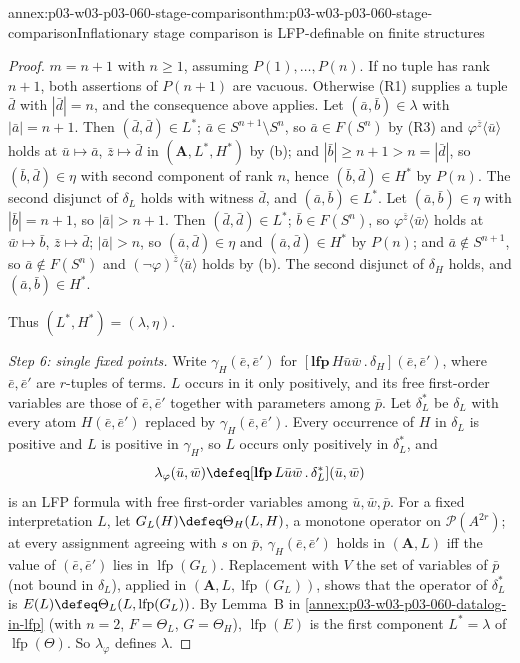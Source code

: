 \begin{annexitem}{annex:p03-w03-p03-060-stage-comparison}{thm:p03-w03-p03-060-stage-comparison}{Inflationary stage comparison is LFP-definable on finite structures}
\begin{proof}
\(m=n+1\) with \(n\ge1\), assuming \(P(1),\ldots,P(n)\).
If no tuple has rank \(n+1\), both assertions of \(P(n+1)\)
are vacuous. Otherwise (R1) supplies a tuple \(\bar d\) with
\(|\bar d|=n\), and the consequence above applies. Let
\((\bar a,\bar b)\in\lambda\) with \(|\bar a|=n+1\). Then
\((\bar d,\bar d)\in L^\ast\); \(\bar a\in S^{n+1}\setminus S^n\), so
\(\bar a\in F(S^n)\) by (R3) and \(\varphi^{\bar z}\langle\bar u\rangle\)
holds at \(\bar u\mapsto\bar a\), \(\bar z\mapsto\bar d\) in
\((\mathbf A,L^\ast,H^\ast)\) by (b); and \(|\bar b|\ge n+1>n=|\bar d|\),
so \((\bar b,\bar d)\in\eta\) with second component of rank \(n\), hence
\((\bar b,\bar d)\in H^\ast\) by \(P(n)\). The second disjunct of
\(\delta_L\) holds with witness \(\bar d\), and
\((\bar a,\bar b)\in L^\ast\). Let \((\bar a,\bar b)\in\eta\) with
\(|\bar b|=n+1\), so \(|\bar a|>n+1\). Then \((\bar d,\bar d)\in L^\ast\);
\(\bar b\in F(S^n)\), so \(\varphi^{\bar z}\langle\bar w\rangle\) holds at
\(\bar w\mapsto\bar b\), \(\bar z\mapsto\bar d\); \(|\bar a|>n\), so
\((\bar a,\bar d)\in\eta\) and \((\bar a,\bar d)\in H^\ast\) by \(P(n)\);
and \(\bar a\notin S^{n+1}\), so \(\bar a\notin F(S^n)\) and
\((\neg\varphi)^{\bar z}\langle\bar u\rangle\) holds by (b). The second
disjunct of \(\delta_H\) holds, and \((\bar a,\bar b)\in H^\ast\).

Thus \((L^\ast,H^\ast)=(\lambda,\eta)\).

\emph{Step 6: single fixed points.} Write
\(\gamma_H(\bar e,\bar e')\) for
\([\mathbf{lfp}\,H\bar u\bar w\,.\,\delta_H](\bar e,\bar e')\), where
\(\bar e,\bar e'\) are \(r\)-tuples of terms. \(L\) occurs in it only
positively, and its free first-order variables are those of
\(\bar e,\bar e'\) together with parameters among \(\bar p\). Let
\(\delta_L^\ast\) be \(\delta_L\) with every atom \(H(\bar e,\bar e')\)
replaced by \(\gamma_H(\bar e,\bar e')\). Every occurrence of \(H\) in
\(\delta_L\) is positive and \(L\) is positive in \(\gamma_H\), so \(L\)
occurs only positively in \(\delta_L^\ast\), and
\[
 \lambda_\varphi(\bar u,\bar w)\defeq[\mathbf{lfp}\,L\bar u\bar w\,.\,\delta_L^\ast](\bar u,\bar w)
\]
is an LFP formula with free first-order variables among
\(\bar u,\bar w,\bar p\). For a fixed interpretation \(L\), let
\(G_L(H)\defeq\Theta_H(L,H)\), a monotone operator on
\(\mathcal P(A^{2r})\); at every assignment agreeing with \(s\) on
\(\bar p\), \(\gamma_H(\bar e,\bar e')\) holds in \((\mathbf A,L)\) iff the
value of \((\bar e,\bar e')\) lies in \(\operatorname{lfp}(G_L)\).
Replacement with \(V\) the set of variables of \(\bar p\) (not bound in
\(\delta_L\)), applied in \((\mathbf A,L,\operatorname{lfp}(G_L))\), shows
that the operator of \(\delta_L^\ast\) is
\(E(L)\defeq\Theta_L(L,\operatorname{lfp}(G_L))\). By Lemma~B in
\cref{annex:p03-w03-p03-060-datalog-in-lfp} (with \(n=2\),
\(F=\Theta_L\), \(G=\Theta_H\)), \(\operatorname{lfp}(E)\) is the first
component \(L^\ast=\lambda\) of \(\operatorname{lfp}(\Theta)\). So
\(\lambda_\varphi\) defines \(\lambda\).


\end{proof}
\end{annexitem}
